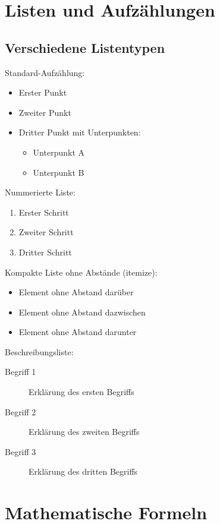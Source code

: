 \section{Listen und Aufzählungen}
\label{sec:listen_demo}

\subsection*{Verschiedene Listentypen}
\label{subsec:listentypen}

Standard-Aufzählung:
\begin{itemize}
	\item Erster Punkt
	\item Zweiter Punkt
	\item Dritter Punkt mit Unterpunkten:
	      \begin{itemize}
		      \item Unterpunkt A
		      \item Unterpunkt B
	      \end{itemize}
\end{itemize}

Nummerierte Liste:
\begin{enumerate}
	\item Erster Schritt
	\item Zweiter Schritt
	\item Dritter Schritt
\end{enumerate}

Kompakte Liste ohne Abstände (itemize):
\begin{itemize}
	\item Element ohne Abstand darüber
	\item Element ohne Abstand dazwischen
	\item Element ohne Abstand darunter
\end{itemize}

Beschreibungsliste:
\begin{description}
	\item[Begriff 1] Erklärung des ersten Begriffs
	\item[Begriff 2] Erklärung des zweiten Begriffs
	\item[Begriff 3] Erklärung des dritten Begriffs
\end{description}

\section{Mathematische Formeln}
\label{sec:formeln_demo}

